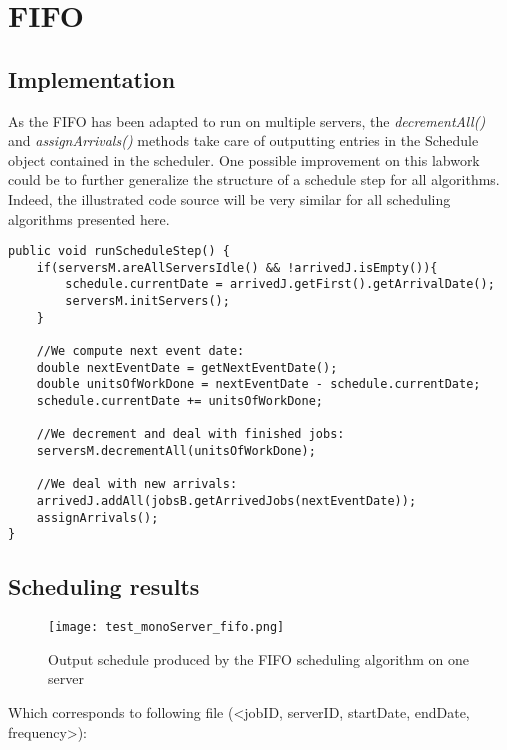 \documentclass[./report.tex]{subfiles}
\begin{document}
\newpage
\section{FIFO}
\subsection{Implementation}

As the FIFO has been adapted to run on multiple servers, the \textit{decrementAll()} and \textit{assignArrivals()} methods take care of outputting entries in the Schedule object contained in the scheduler. One possible improvement on this labwork could be to further generalize the structure of a schedule step for all algorithms. Indeed, the illustrated code source will be very similar for all scheduling algorithms presented here.

\begin{lstlisting}[style=Java, caption={Source code of a FIFO schedule step}]
public void runScheduleStep() {
	if(serversM.areAllServersIdle() && !arrivedJ.isEmpty()){
		schedule.currentDate = arrivedJ.getFirst().getArrivalDate();
		serversM.initServers();
	}
	
	//We compute next event date:
	double nextEventDate = getNextEventDate();
	double unitsOfWorkDone = nextEventDate - schedule.currentDate;
	schedule.currentDate += unitsOfWorkDone;
	
	//We decrement and deal with finished jobs:
	serversM.decrementAll(unitsOfWorkDone);
	
	//We deal with new arrivals:
	arrivedJ.addAll(jobsB.getArrivedJobs(nextEventDate));
	assignArrivals();
}
\end{lstlisting}



\newpage
\subsection{Scheduling results}
\begin{figure}[!h]
	\center
	\texttt{[image: test\_monoServer\_fifo.png]}
	\caption{Output schedule produced by the FIFO scheduling algorithm on one server}
	\label{fig:monoServer_fifo} 
\end{figure}

Which corresponds to following file (<jobID, serverID, startDate, endDate, frequency>):

\end{document}
